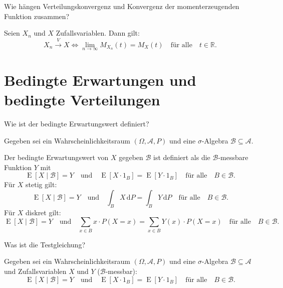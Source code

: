 \begin{QandA}
    \item Wie hängen Verteilungskonvergenz und Konvergenz der momenterzeugenden Funktion zusammen?
    \begin{answered}
        Seien $X_n$ und $X$ Zufallsvariablen. Dann gilt:
        \[
            X_n \xrightarrow{V} X \iff \lim_{n\to\infty} M_{X_n}(t) = M_X(t) \quad \text{für alle} \quad t \in \mathbb{R}.
        \]
    \end{answered}
\end{QandA}

\newpage
\section*{Bedingte Erwartungen und bedingte Verteilungen}

\begin{QandA}
    \item Wie ist der bedingte Erwartungswert definiert?
    \begin{answered}
        Gegeben sei ein Wahrscheinlichkeitsraum $(\Omega, \mathcal{A}, P)$ und eine $\sigma$-Algebra $\mathcal{B} \subseteq \mathcal{A}$.

        Der bedingte Erwartungswert von $X$ gegeben $\mathcal{B}$ ist definiert als die $\mathcal{B}$-messbare Funktion $Y$ mit
        \begin{equation}
            \tag{Testgleichung}
            \operatorname{E}[X \mid \mathcal{B}] = Y \quad \text{und} \quad \operatorname{E}[X \cdot 1_B] = \operatorname{E}[Y \cdot 1_B] \quad \text{für alle} \quad B \in \mathcal{B}.
        \end{equation}
        Für $X$ stetig gilt:
        \[
            \operatorname{E}[X \mid \mathcal{B}] = Y \quad \text{und} \quad \int_B X \, \mathrm{d}P = \int_B Y \, \mathrm{d}P \quad \text{für alle} \quad B \in \mathcal{B}.
        \]
        Für $X$ diskret gilt:
        \[
            \operatorname{E}[X \mid \mathcal{B}] = Y \quad \text{und} \quad \sum_{x \in B} x \cdot P(X = x) = \sum_{x \in B} Y(x) \cdot P(X = x) \quad \text{für alle} \quad B \in \mathcal{B}.
        \]
    \end{answered}

    \item Was ist die Testgleichung?
    \begin{answered}
        Gegeben sei ein Wahrscheinlichkeitsraum $(\Omega, \mathcal{A}, P)$ und eine $\sigma$-Algebra $\mathcal{B} \subseteq \mathcal{A}$ und Zufallsvariablen $X$ und $Y$ ($\mathcal{B}$-messbar):
        \begin{equation}
            \tag{Testgleichung}
            \operatorname{E}[X \mid \mathcal{B}] = Y \quad \text{und} \quad \operatorname{E}[X \cdot 1_B] = \operatorname{E}[Y \cdot 1_B] \quad \text{für alle} \quad B \in \mathcal{B}.
        \end{equation}
    \end{answered}


\end{QandA}
